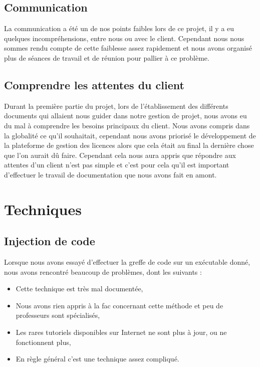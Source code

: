 \subsection{Communication}

La communication a été un de nos points faibles lors de ce projet, il y a eu quelques incompréhensions, entre nous ou avec le client. Cependant nous nous sommes rendu compte
de cette faiblesse assez rapidement et nous avons organisé plus de séances de travail et de réunion pour pallier à ce problème.

\subsection{Comprendre les attentes du client}

Durant la première partie du projet, lors de l'établissement des différents documents qui allaient nous guider dans notre gestion de projet, nous avons eu du mal à comprendre
les besoins principaux du client. Nous avons compris dans la globalité ce qu'il souhaitait, cependant nous avons priorisé le développement de la plateforme de gestion des licences
alors que cela était au final la dernière chose que l'on aurait dû faire. Cependant cela nous aura appris que répondre aux attentes d'un client n'est pas simple et c'est pour cela
qu'il est important d'effectuer le travail de documentation que nous avons fait en amont.

\section{Techniques}

\subsection{Injection de code}

Lorsque nous avons essayé d'effectuer la greffe de code sur un exécutable donné, nous avons rencontré beaucoup de problèmes, dont les suivants :
\begin{itemize}
    \item Cette technique est très mal documentée,
    \item Nous avons rien appris à la fac concernant cette méthode et peu de professeurs sont spécialisés,
    \item Les rares tutoriels disponibles sur Internet ne sont plus à jour, ou ne fonctionnent plus,
    \item En règle général c'est une technique assez compliqué.
\end{itemize}

